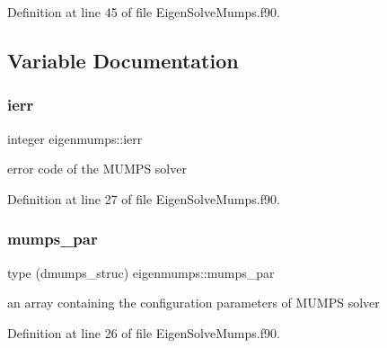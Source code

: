 Definition at line 45 of file Eigen\+Solve\+Mumps.\+f90.



\subsection{Variable Documentation}
\mbox{\label{namespaceeigenmumps_a0b6d919fe610b180483db0dcba47ba1c}} 
\subsubsection{\texorpdfstring{ierr}{ierr}}
{\footnotesize\ttfamily integer eigenmumps\+::ierr}



error code of the M\+U\+M\+PS solver 



Definition at line 27 of file Eigen\+Solve\+Mumps.\+f90.

\mbox{\label{namespaceeigenmumps_a96a8141178a4cd84a24bd63b11685409}} 
\subsubsection{\texorpdfstring{mumps\+\_\+par}{mumps\_par}}
{\footnotesize\ttfamily type (dmumps\+\_\+struc) eigenmumps\+::mumps\+\_\+par}



an array containing the configuration parameters of M\+U\+M\+PS solver 



Definition at line 26 of file Eigen\+Solve\+Mumps.\+f90.


